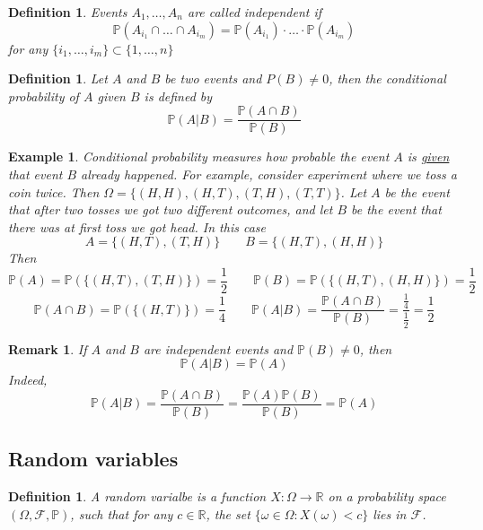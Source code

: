 \documentclass[12pt]{article}
\newtheorem{remark}[theorem]{Remark}
\newtheorem{definition}[theorem]{Definition}
\newtheorem{example}[theorem]{Example}
\begin{document}
\begin{definition} Events $A_1,\ldots,A_n$ are called independent if
    $$
        \mathbb{P}(A_{i_1}\cap\ldots\cap A_{i_m})
        =\mathbb{P}(A_{i_1})\cdot
        \ldots
        \cdot\mathbb{P}(A_{i_m})
    $$
    for any $\{i_1,\ldots,i_m\}\subset \{1,\ldots,n\}$
\end{definition}

\begin{definition} Let $A$ and $B$ be two events and $P(B)\neq 0$, then the
    conditional probability of $A$ given $B$ is defined by
    $$
        \mathbb{P}(A|B)=\frac{\mathbb{P}(A\cap B)}{\mathbb{P}(B)}
    $$
\end{definition}

\begin{example} Conditional probability measures how probable the event $A$ is
    \underline{given} that event $B$ already happened. For example, consider
    experiment where we toss a coin twice. Then $\Omega=\{(H, H), (H, T), (T,H),
        (T,T)\}$. Let $A$ be the event that after two tosses we got two different
    outcomes, and let $B$ be the event that there was at first toss we got head.
    In this case
    $$
        A=\{(H,T),(T,H)\}\quad\quad B=\{(H,T),(H,H)\}
    $$
    Then
    $$
        \mathbb{P}(A)=\mathbb{P}(\{(H,T),(T,H)\})
        =\frac{1}{2}\quad\quad \mathbb{P}(B)
        =\mathbb{P}(\{(H,T),(H,H)\})=\frac{1}{2}
    $$
    $$
        \mathbb{P}(A\cap B)=\mathbb{P}(\{(H,T)\})
        =\frac{1}{4}\quad\quad \mathbb{P}(A|B)
        =\frac{\mathbb{P}(A\cap B)}{\mathbb{P}(B)}
        =\frac{\frac{1}{4}}{\frac{1}{2}}=\frac{1}{2}
    $$
\end{example}

\begin{remark} If $A$ and $B$ are independent events and $\mathbb{P}(B)\neq 0$,
    then
    $$
        \mathbb{P}(A|B)=\mathbb{P}(A)
    $$
    Indeed,
    $$
        \mathbb{P}(A|B)
        =\frac{\mathbb{P}(A\cap B)}{\mathbb{P}(B)}
        =\frac{\mathbb{P}(A)\mathbb{P}(B)}{\mathbb{P}(B)}=\mathbb{P}(A)
    $$
\end{remark}


\subsection{Random variables}

\begin{definition} A random varialbe is a function $X:\Omega\to \mathbb{R}$ on a
    probability space $(\Omega,\mathcal{F},\mathbb{P})$, such that for any 
    $c\in\mathbb{R}$, the set $\{ \omega\in\Omega: X(\omega)<c\}$ lies 
    in $\mathcal{F}$.
\end{definition}
\end{document}
